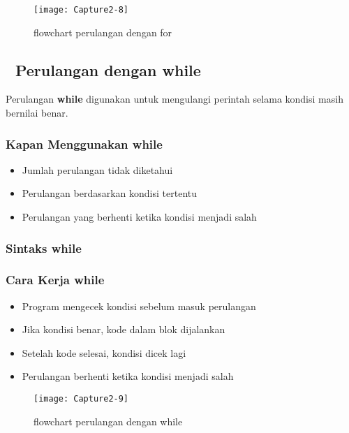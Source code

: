 \begin{figure}[htbp]
\centering
\texttt{[image: Capture2-8]}
\caption{flowchart perulangan dengan for}
\end{figure}

\subsection{🔄 Perulangan dengan while}\label{perulangan-dengan-while}

Perulangan \textbf{while} digunakan untuk mengulangi perintah selama kondisi masih bernilai benar.

\subsubsection{Kapan Menggunakan while}

\begin{itemize}
\item Jumlah perulangan tidak diketahui
\item Perulangan berdasarkan kondisi tertentu
\item Perulangan yang berhenti ketika kondisi menjadi salah
\end{itemize}

\subsubsection{Sintaks while}



\subsubsection{Cara Kerja while}

\begin{itemize}
\item Program mengecek kondisi sebelum masuk perulangan
\item Jika kondisi benar, kode dalam blok dijalankan
\item Setelah kode selesai, kondisi dicek lagi
\item Perulangan berhenti ketika kondisi menjadi salah
\end{itemize}

\begin{figure}[htbp]
\centering
\texttt{[image: Capture2-9]}
\caption{flowchart perulangan dengan while}
\end{figure}

